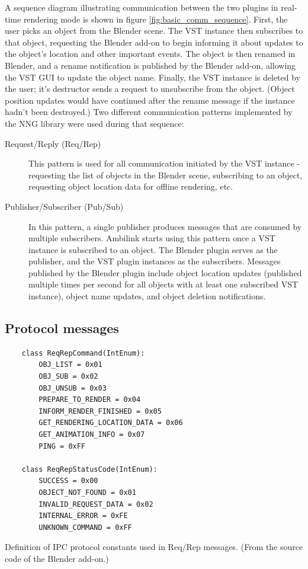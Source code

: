 A sequence diagram illustrating communication between the two plugins in real-time rendering mode is shown in figure \ref{fig:basic_comm_sequence}.
First, the user picks an object from the Blender scene. The VST instance then subscribes to that object,
requesting the Blender add-on to begin informing it about updates to the object's location and other important events.
The object is then renamed in Blender, and a rename notification is published by the Blender add-on, allowing the VST GUI to update the object name.
Finally, the VST instance is deleted by the user; it's destructor sends a request to unsubscribe from the object. 
(Object position updates would have continued after the rename message if the instance hadn't been destroyed.)
Two different communication patterns implemented by the NNG library were used during that sequence:
\begin{description}
    \item[Request/Reply (Req/Rep)] This pattern is used for all communication initiated by the VST instance - requesting the list of objects in the Blender scene, subscribing to an object, 
    requesting object location data for offline rendering, etc.
    \item[Publisher/Subscriber (Pub/Sub)] In this pattern, a single publisher produces messages that are consumed by multiple subscribers.
    Ambilink starts using this pattern once a VST instance is subscribed to an object. The Blender plugin serves as the publisher, and the VST plugin instances as the subscribers.
    Messages published by the Blender plugin include object location updates (published multiple times per second for all objects with at least one subscribed VST instance),
    object name updates, and object deletion notifications.
\end{description}

\subsection{Protocol messages}
\begin{listing}[ht]
    \begin{verbatim}
    class ReqRepCommand(IntEnum):
        OBJ_LIST = 0x01
        OBJ_SUB = 0x02
        OBJ_UNSUB = 0x03
        PREPARE_TO_RENDER = 0x04
        INFORM_RENDER_FINISHED = 0x05
        GET_RENDERING_LOCATION_DATA = 0x06
        GET_ANIMATION_INFO = 0x07
        PING = 0xFF
    
    class ReqRepStatusCode(IntEnum):
        SUCCESS = 0x00
        OBJECT_NOT_FOUND = 0x01
        INVALID_REQUEST_DATA = 0x02
        INTERNAL_ERROR = 0xFE
        UNKNOWN_COMMAND = 0xFF
    \end{verbatim}
    \caption{Definition of IPC protocol constants used in Req/Rep messages. (From the source code of the Blender add-on.)}
    \label{code:ipc_constant_definition}
\end{listing}

